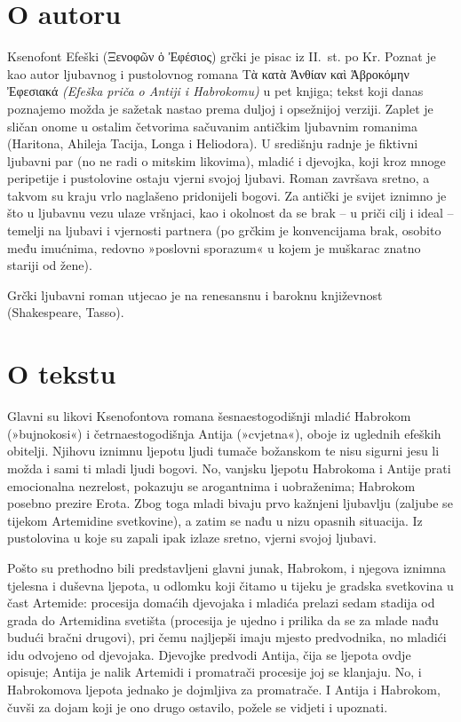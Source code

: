\section*{O autoru}

Ksenofont Efeški \textgreek[variant=ancient]{(Ξενοφῶν ὁ Ἐφέσιος)} grčki je pisac iz II.~st. po Kr. Poznat je kao autor ljubavnog i pustolovnog romana \textgreek[variant=ancient]{Τὰ κατὰ Ἀνθίαν καὶ Ἁβροκόμην Ἐφεσιακά} \textit{(Efeška priča o Antiji i Habrokomu)} u pet knjiga; tekst koji danas poznajemo možda je sažetak nastao prema duljoj i opsežnijoj verziji. Zaplet je sličan onome u ostalim četvorima sačuvanim antičkim ljubavnim romanima (Haritona, Ahileja Tacija, Longa i Heliodora). U središnju radnje je fiktivni ljubavni par (no ne radi o mitskim likovima), mladić i djevojka, koji kroz mnoge peripetije i pustolovine ostaju vjerni svojoj ljubavi. Roman završava sretno, a takvom su kraju vrlo naglašeno pridonijeli bogovi. Za antički je svijet iznimno je što u ljubavnu vezu ulaze vršnjaci, kao i okolnost da se brak – u priči cilj i ideal – temelji na ljubavi i vjernosti partnera (po grčkim je konvencijama brak, osobito među imućnima, redovno »poslovni sporazum« u kojem je muškarac znatno stariji od žene).

Grčki ljubavni roman utjecao je na renesansnu i baroknu književnost (Shakespeare, Tasso).

\section*{O tekstu}

Glavni su likovi Ksenofontova romana šesnaestogodišnji mladić Habrokom (»bujnokosi«) i četrnaestogodišnja Antija (»cvjetna«), oboje iz uglednih efeških obitelji. Njihovu iznimnu ljepotu ljudi tumače božanskom te nisu sigurni jesu li možda i sami ti mladi ljudi bogovi. No, vanjsku ljepotu Habrokoma i Antije prati emocionalna nezrelost, pokazuju se arogantnima i uobraženima; Habrokom posebno prezire Erota. Zbog toga mladi bivaju prvo kažnjeni ljubavlju (zaljube se tijekom Artemidine svetkovine), a zatim se nađu u nizu opasnih situacija. Iz pustolovina u koje su zapali ipak izlaze sretno, vjerni svojoj ljubavi.

Pošto su prethodno bili predstavljeni glavni junak, Habrokom, i njegova iznimna tjelesna i duševna ljepota, u odlomku koji čitamo u tijeku je gradska svetkovina u čast Artemide: procesija domaćih djevojaka i mladića prelazi sedam stadija od grada do Artemidina svetišta (procesija je ujedno i prilika da se za mlade nađu budući bračni drugovi), pri čemu najljepši imaju mjesto predvodnika, no mladići idu odvojeno od djevojaka. Djevojke predvodi Antija, čija se ljepota ovdje opisuje; Antija je nalik Artemidi i promatrači procesije joj se klanjaju. No, i Habrokomova ljepota jednako je dojmljiva za promatrače. I Antija i Habrokom, čuvši za dojam koji je ono drugo ostavilo, požele se vidjeti i upoznati.

